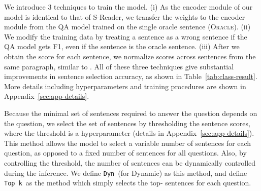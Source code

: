\documentclass[11pt,a4paper]{article}
\newcommand{\topk}{{\tt Top k}}
\newcommand{\dyn}{{\tt Dyn}}
\newcommand{\oracleshort}{(\textsc{Oracle})}
\newcommand{\reduce}{\vspace*{-3pt}}
\begin{document}
\begin{table*}[ht]
\begin{center}
\end{center}
\reduce
\caption{ Dataset used for experiments. `N word', `N sent' and `N doc' refer to the average number of words, sentences and documents, respectively.
All statistics are calculated on the development set. 
For SQuAD-Open, since the task is in open-domain, we calculated the statistics based on top 10 documents from Document Retriever in DrQA~\citep{squad-open}.} 
\label{tab:dataset}
\vspace{-8pt}
\end{table*} 
We introduce 3 techniques to train the model.
(i) As the encoder module of our model is identical to that of S-Reader, we transfer the weights to the encoder module from the QA model trained on the single oracle sentence \oracleshort.
(ii) We modify the training data by treating a sentence as a wrong sentence if the QA model gets  F1, even if the sentence is the oracle sentence.
(iii) After we obtain the score for each sentence, we normalize scores across sentences from the same paragraph, similar to \citet{simple-and-effective}. 
All of these three techniques give substantial improvements in sentence selection accuracy, as shown in Table~\ref{tab:class-result}.
More details including hyperparameters and training procedures are shown in Appendix~\ref{sec:app-details}.



Because the minimal set of sentences required to answer the question depends on the question, we select the set of sentences by thresholding the sentence scores, where the threshold is a hyperparameter (details in Appendix~\ref{sec:app-details}).
This method allows the model to 
select a variable number of sentences for each question, as opposed to a fixed number of sentences for all questions. Also, by controlling the threshold, the number of sentences can be dynamically controlled during the inference. We  define \dyn~(for Dynamic) as this method, and define \topk~as the method which simply selects the top- sentences for each question.
\end{document}
